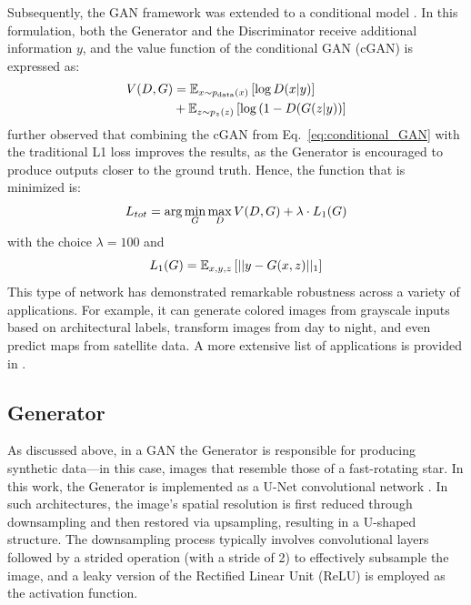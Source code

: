 Subsequently, the GAN framework was extended to a conditional model \citep{mirza2014conditional}. In this formulation, both the Generator and the Discriminator receive additional information $y$, and the value function of the conditional GAN (cGAN) is expressed as:
\begin{equation}
	\centering
	\begin{aligned}
		V(D, G) &= \mathbb{E}_{x \sim p_{\rm data}(x)} \left[ \log D(x|y) \right] \\
		&+ \mathbb{E}_{z \sim p_{z}(z)} \left[ \log \left( 1-D(G(z|y) \right) \right]
	\end{aligned}
	\label{eq:conditional_GAN}
\end{equation}
\cite{isola2017image} further observed that combining the cGAN from Eq.~\eqref{eq:conditional_GAN} with the traditional L1 loss improves the results, as the Generator is encouraged to produce outputs closer to the ground truth. Hence, the function that is minimized is:
\begin{equation}
	\centering
	L_{tot} = \arg \min_{G} \max_{D} V(D, G) + \lambda \cdot L_1(G)
	\label{eq:total_gen_loss}
\end{equation}
with the choice $\lambda = 100$ and
\begin{equation}
	\centering
	L_1(G) = \mathbb{E}_{x,y,z} \left[ ||{y - G(x,z)}||_1 \right]
	\label{eq:l1_loss}
\end{equation}
This type of network has demonstrated remarkable robustness across a variety of applications. For example, it can generate colored images from grayscale inputs based on architectural labels, transform images from day to night, and even predict maps from satellite data. A more extensive list of applications is provided in \cite{isola2017image}.


\subsection{Generator}
As discussed above, in a GAN the Generator is responsible for producing synthetic data—in this case, images that resemble those of a fast-rotating star. In this work, the Generator is implemented as a U-Net convolutional network \citep{ronneberger2015u}. In such architectures, the image's spatial resolution is first reduced through downsampling and then restored via upsampling, resulting in a U-shaped structure. The downsampling process typically involves convolutional layers followed by a strided operation (with a stride of 2) to effectively subsample the image, and a leaky version of the Rectified Linear Unit (ReLU) is employed as the activation function.

